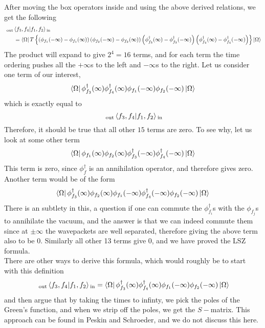 \documentclass[11pt]{article}
\numberwithin{equation}{section}
\begin{document}
After moving the box operators inside and using the above derived relations, we get the following
\begin{align*}
    &{~}_{\text{out}}\braket{f_3, f_4|f_1, f_2}{}_{\text{in}} \\
    &~~~~~= \bra{\Omega} T\left\{  \left(  \phi_{f_1}(-\infty) - \phi_{f_1}(\infty)  \right) \left(  \phi_{f_2}(-\infty) - \phi_{f_2}(\infty)  \right) \left(  \phi^\dagger_{f_3}(\infty) - \phi^\dagger_{f_3}(-\infty)  \right) \left(  \phi^\dagger_{f_4}(\infty) - \phi^\dagger_{f_4}(-\infty)  \right)   \right\} \ket{\Omega}    
\end{align*}
The product will expand to give \(2^4 = 16\) terms, and for each term the time ordering pushes all the \(+\infty\)s to the left and \(-\infty\)s to the right. Let us consider one term of our interest, 
\begin{equation*}
    \bra{\Omega} \phi^\dagger_{f_3}(\infty)\phi_{f_4}^\dagger(\infty) \phi_{f_1}(-\infty)\phi_{f_2}(-\infty)\ket{\Omega}
\end{equation*}
which is exactly equal to 
\begin{equation*}
    {~}_{\text{out}}\braket{f_3, f_4|f_1, f_2}{}_{\text{in}}
\end{equation*}
Therefore, it should be true that all other \(15\) terms are zero. To see why, let us look at some other term 
\begin{equation*}
    \bra{\Omega} \phi_{f_1}(\infty)\phi_{f_2}(\infty)\phi^\dagger_{f_3}(-\infty)\phi_{f_4}^\dagger(-\infty) \ket{\Omega}
\end{equation*}
This term is zero, since \(\phi_f^\dagger\) is an annihilation operator, and therefore gives zero. 
Another term would be of the form 
\begin{equation*}
    \bra{\Omega} \phi^\dagger_{f_3}(\infty)\phi_{f_2}(\infty) \phi_{f_1}(-\infty)\phi_{f_4}^\dagger(-\infty)\phi_{f_2}(-\infty)\ket{\Omega}    
\end{equation*}
There is an subtlety in this, a question if one can commute the \(\phi_{f_i}^\dagger\)s with the \(\phi_{f_j}\)s to annihilate the vacuum, and the answer is that we can indeed commute them since at \(\pm\infty\) the wavepackets are well separated, therefore giving the above term also to be 0. Similarly all other 13 terms give 0, and we have proved the LSZ formula.\\

There are other ways to derive this formula, which would roughly be to start with this definition 
\begin{equation*}
    {~}_{\text{out}}\braket{f_3, f_4|f_1, f_2}{}_{\text{in}} = \bra{\Omega} \phi^\dagger_{f_3}(\infty)\phi_{f_4}^\dagger(\infty) \phi_{f_1}(-\infty)\phi_{f_2}(-\infty)\ket{\Omega}
\end{equation*}
and then argue that by taking the times to infinty, we pick the poles of the Green's function, and when we strip off the poles, we get the \(S-\)matrix. This approach can be found in Peskin and Schroeder, and we do not discuss this here. \\
\end{document}
